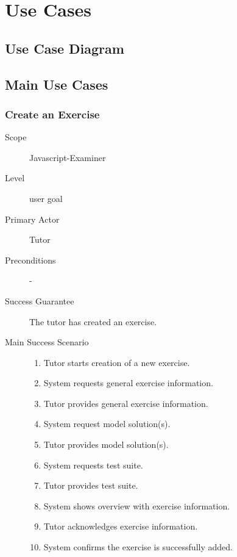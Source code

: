 \section{Use Cases}

\subsection{Use Case Diagram}

\subsection{Main Use Cases}

\subsubsection{Create an Exercise}
\begin{mdframed} [rightmargin=-100pt]
\begin{description}
  \item[Scope] Javascript-Examiner
  \item[Level] user goal
  \item[Primary Actor] Tutor
  \item[Preconditions] -
  \item[Success Guarantee] The tutor has created an exercise.
  \item[Main Success Scenario] \mbox{}
	\begin{enumerate}
	  \item Tutor starts creation of a new exercise.
	  \item System requests general exercise information.
	  \item Tutor provides general exercise information.
    \item System request model solution(s).
    \item Tutor provides model solution(s).
    \item System requests test suite.
    \item Tutor provides test suite.
    \item System shows overview with exercise information.
    \item Tutor acknowledges exercise information.
    \item System confirms the exercise is successfully added.
	\end{enumerate}
\end{description}
\end{mdframed}

